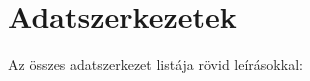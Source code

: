 \section{Adatszerkezetek}
Az összes adatszerkezet listája rövid leírásokkal\-:\begin{DoxyCompactList}
\item{}
\end{DoxyCompactList}
